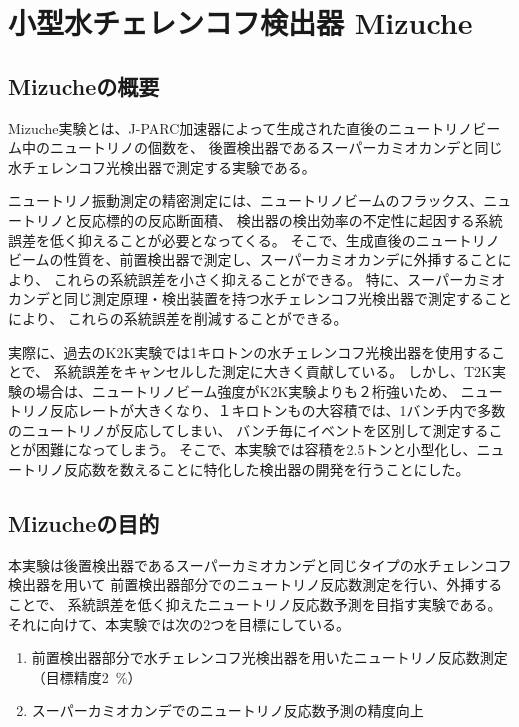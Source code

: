\chapter{小型水チェレンコフ検出器 Mizuche}

\section{Mizucheの概要}

Mizuche実験とは、J-PARC加速器によって生成された直後のニュートリノビーム中のニュートリノの個数を、
後置検出器であるスーパーカミオカンデと同じ水チェレンコフ光検出器で測定する実験である。

ニュートリノ振動測定の精密測定には、ニュートリノビームのフラックス、ニュートリノと反応標的の反応断面積、
検出器の検出効率の不定性に起因する系統誤差を低く抑えることが必要となってくる。
そこで、生成直後のニュートリノビームの性質を、前置検出器で測定し、スーパーカミオカンデに外挿することにより、
これらの系統誤差を小さく抑えることができる。
特に、スーパーカミオカンデと同じ測定原理・検出装置を持つ水チェレンコフ光検出器で測定することにより、
これらの系統誤差を削減することができる。

実際に、過去のK2K実験では1キロトンの水チェレンコフ光検出器を使用することで、
系統誤差をキャンセルした測定に大きく貢献している。
しかし、T2K実験の場合は、ニュートリノビーム強度がK2K実験よりも２桁強いため、
ニュートリノ反応レートが大きくなり、１キロトンもの大容積では、1バンチ内で多数のニュートリノが反応してしまい、
バンチ毎にイベントを区別して測定することが困難になってしまう。
そこで、本実験では容積を2.5トンと小型化し、ニュートリノ反応数を数えることに特化した検出器の開発を行うことにした。

\section{Mizucheの目的}

本実験は後置検出器であるスーパーカミオカンデと同じタイプの水チェレンコフ検出器を用いて
前置検出器部分でのニュートリノ反応数測定を行い、外挿することで、
系統誤差を低く抑えたニュートリノ反応数予測を目指す実験である。
それに向けて、本実験では次の2つを目標にしている。

\begin{enumerate}
  \item 前置検出器部分で水チェレンコフ光検出器を用いたニュートリノ反応数測定（目標精度\qty{2}{\percent}）
  \item スーパーカミオカンデでのニュートリノ反応数予測の精度向上
\end{enumerate}

